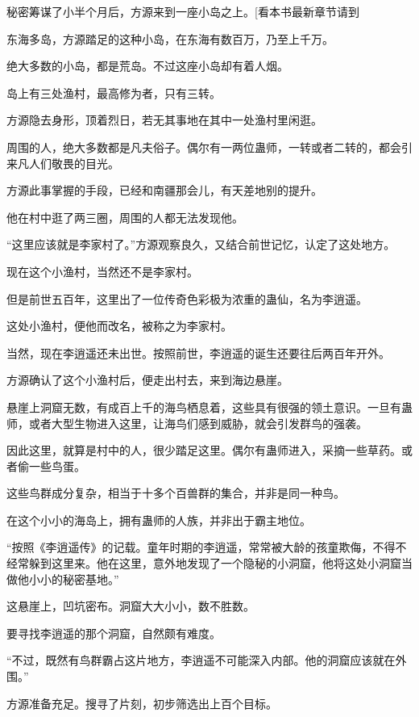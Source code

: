 
\begin{this_body}

秘密筹谋了小半个月后，方源来到一座小岛之上。[看本书最新章节请到

东海多岛，方源踏足的这种小岛，在东海有数百万，乃至上千万。

绝大多数的小岛，都是荒岛。不过这座小岛却有着人烟。

岛上有三处渔村，最高修为者，只有三转。

方源隐去身形，顶着烈日，若无其事地在其中一处渔村里闲逛。

周围的人，绝大多数都是凡夫俗子。偶尔有一两位蛊师，一转或者二转的，都会引来凡人们敬畏的目光。

方源此事掌握的手段，已经和南疆那会儿，有天差地别的提升。

他在村中逛了两三圈，周围的人都无法发现他。

“这里应该就是李家村了。”方源观察良久，又结合前世记忆，认定了这处地方。

现在这个小渔村，当然还不是李家村。

但是前世五百年，这里出了一位传奇色彩极为浓重的蛊仙，名为李逍遥。

这处小渔村，便他而改名，被称之为李家村。

当然，现在李逍遥还未出世。按照前世，李逍遥的诞生还要往后两百年开外。

方源确认了这个小渔村后，便走出村去，来到海边悬崖。

悬崖上洞窟无数，有成百上千的海鸟栖息着，这些具有很强的领土意识。一旦有蛊师，或者大型生物进入这里，让海鸟们感到威胁，就会引发群鸟的强袭。

因此这里，就算是村中的人，很少踏足这里。偶尔有蛊师进入，采摘一些草药。或者偷一些鸟蛋。

这些鸟群成分复杂，相当于十多个百兽群的集合，并非是同一种鸟。

在这个小小的海岛上，拥有蛊师的人族，并非出于霸主地位。

“按照《李逍遥传》的记载。童年时期的李逍遥，常常被大龄的孩童欺侮，不得不经常躲到这里来。他在这里，意外地发现了一个隐秘的小洞窟，他将这处小洞窟当做他小小的秘密基地。”

这悬崖上，凹坑密布。洞窟大大小小，数不胜数。

要寻找李逍遥的那个洞窟，自然颇有难度。

“不过，既然有鸟群霸占这片地方，李逍遥不可能深入内部。他的洞窟应该就在外围。”

方源准备充足。搜寻了片刻，初步筛选出上百个目标。


\end{this_body}
